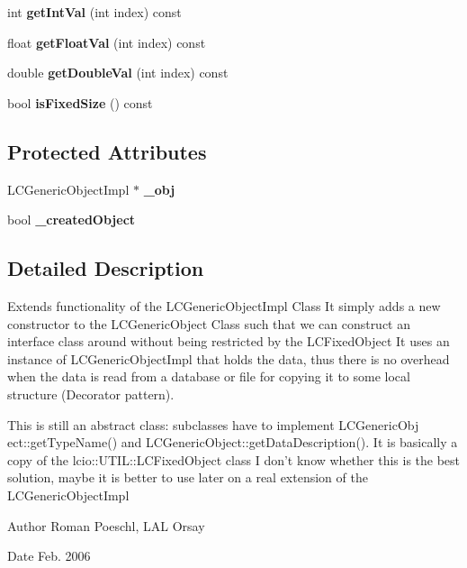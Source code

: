 \begin{DoxyCompactItemize}
\item 
int {\bfseries get\-Int\-Val} (int index) const \label{classCALICE_1_1LCGenericObjectImplExt_a57a61745bb48cd3917ddf1ba37f8a3e0}

\item 
float {\bfseries get\-Float\-Val} (int index) const \label{classCALICE_1_1LCGenericObjectImplExt_adda599738de7681f6c0d1b2aa3b09f79}

\item 
double {\bfseries get\-Double\-Val} (int index) const \label{classCALICE_1_1LCGenericObjectImplExt_ae10468f12c1a49ce00fceeb3f6664cbe}

\item 
bool {\bfseries is\-Fixed\-Size} () const \label{classCALICE_1_1LCGenericObjectImplExt_ae546a36a343a9376e818e0b2d9a96e4d}

\end{DoxyCompactItemize}
\subsection*{Protected Attributes}
\begin{DoxyCompactItemize}
\item 
L\-C\-Generic\-Object\-Impl $\ast$ {\bfseries \-\_\-obj}\label{classCALICE_1_1LCGenericObjectImplExt_a29179cf5508768d2cdbc9e2e6997bfdf}

\item 
bool {\bfseries \-\_\-created\-Object}\label{classCALICE_1_1LCGenericObjectImplExt_a65c76ade794ece6642ce4a6fc0ed1a8f}

\end{DoxyCompactItemize}


\subsection{Detailed Description}
Extends functionality of the L\-C\-Generic\-Object\-Impl Class It simply adds a new constructor to the L\-C\-Generic\-Object Class such that we can construct an interface class around without being restricted by the L\-C\-Fixed\-Object It uses an instance of L\-C\-Generic\-Object\-Impl that holds the data, thus there is no overhead when the data is read from a database or file for copying it to some local structure (Decorator pattern). 

\par
 This is still an abstract class\-: subclasses have to implement L\-C\-Generic\-Obj ect\-::get\-Type\-Name() and L\-C\-Generic\-Object\-::get\-Data\-Description(). It is basically a copy of the lcio\-::\-U\-T\-I\-L\-::\-L\-C\-Fixed\-Object class I don't know whether this is the best solution, maybe it is better to use later on a real extension of the L\-C\-Generic\-Object\-Impl \begin{DoxyAuthor}{Author}
Roman Poeschl, L\-A\-L Orsay 
\end{DoxyAuthor}
\begin{DoxyDate}{Date}
Feb. 2006 
\end{DoxyDate}


